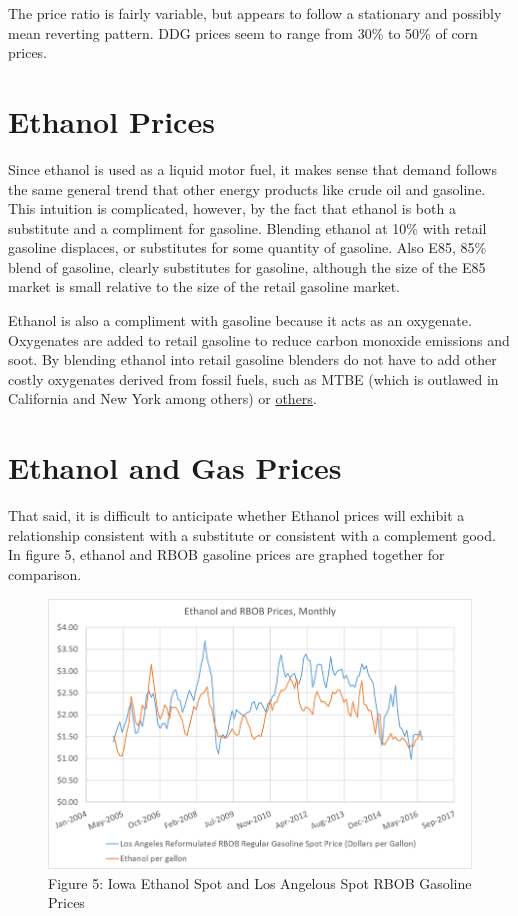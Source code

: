 \documentclass[]{book}
\theoremstyle{definition}
\theoremstyle{definition}
\theoremstyle{remark}
\begin{document}
The price ratio is fairly variable, but appears to follow a stationary
and possibly mean reverting pattern. DDG prices seem to range from 30\%
to 50\% of corn prices.

\section{Ethanol Prices}\label{ethanol-prices}

Since ethanol is used as a liquid motor fuel, it makes sense that demand
follows the same general trend that other energy products like crude oil
and gasoline. This intuition is complicated, however, by the fact that
ethanol is both a substitute and a compliment for gasoline. Blending
ethanol at 10\% with retail gasoline displaces, or substitutes for some
quantity of gasoline. Also E85, 85\% blend of gasoline, clearly
substitutes for gasoline, although the size of the E85 market is small
relative to the size of the retail gasoline market.

Ethanol is also a compliment with gasoline because it acts as an
oxygenate. Oxygenates are added to retail gasoline to reduce carbon
monoxide emissions and soot. By blending ethanol into retail gasoline
blenders do not have to add other costly oxygenates derived from fossil
fuels, such as MTBE (which is outlawed in California and New York among
others) or \href{https://en.wikipedia.org/wiki/Oxygenate}{others}.

\section{Ethanol and Gas Prices}\label{ethanol-and-gas-prices}

That said, it is difficult to anticipate whether Ethanol prices will
exhibit a relationship consistent with a substitute or consistent with a
complement good. In figure 5, ethanol and RBOB gasoline prices are
graphed together for comparison.

\begin{figure}[htbp]
\centering
\includegraphics{Excel-files/EthanolMarketsand-Ethanol_files/image006.png}
\caption{Figure 5: Iowa Ethanol Spot and Los Angelous Spot RBOB Gasoline
Prices}
\end{figure}
\end{document}
